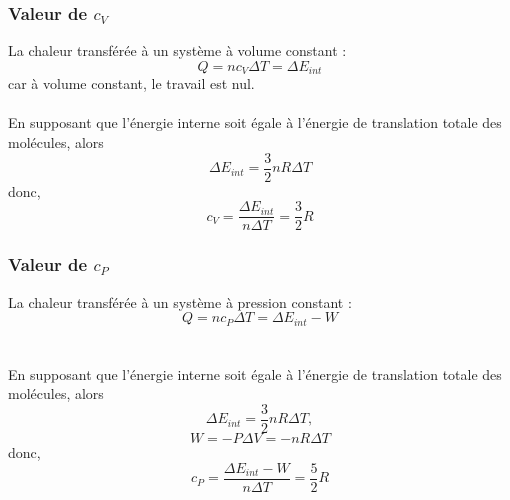\documentclass{article}
\begin{document}
        \subsubsection{Valeur de $c_V$}
            La chaleur transférée à un système à volume constant :
            $$
            Q = n c_V \Delta T = \Delta E_{int}
            $$
            car à volume constant, le travail est nul. \\\\
            En supposant que l’énergie interne soit égale à l’énergie de translation totale des molécules, alors
            $$
            \Delta E_{int} = \frac{3}{2} n R \Delta T 
            $$
            donc,
            $$
            c_V = \frac{\Delta E_{int}}{n \Delta T} = \frac{3}{2} R
            $$
        
        \subsubsection{Valeur de $c_P$}
            La chaleur transférée à un système à pression constant :
            $$
            Q = n c_P \Delta T = \Delta E_{int} - W
            $$\\\\
            En supposant que l’énergie interne soit égale à l’énergie de translation totale des molécules, alors
            $$
            \Delta E_{int} = \frac{3}{2} n R \Delta T,
            $$
            $$
            W = -P \Delta V = -n R \Delta T
            $$
            donc,
            $$
            c_P = \frac{\Delta E_{int} - W}{n \Delta T} = \frac{5}{2} R
            $$
\end{document}
